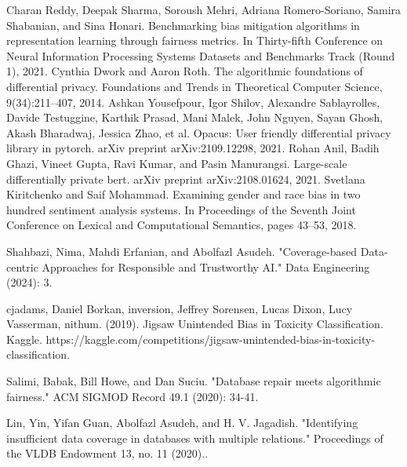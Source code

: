 \documentclass[11pt]{article} %
\begin{document}
\begin{thebibliography}{10}
\begin{small}
 Charan Reddy, Deepak Sharma, Soroush Mehri, Adriana Romero-Soriano, Samira Shabanian, and Sina Honari. Benchmarking bias mitigation algorithms in representation learning through fairness metrics. In Thirty-fifth Conference on Neural Information Processing Systems Datasets and Benchmarks Track (Round 1), 2021.
 Cynthia Dwork and Aaron Roth. The algorithmic foundations of differential privacy. Foundations and Trends in Theoretical Computer Science, 9(34):211–407, 2014.
 Ashkan Yousefpour, Igor Shilov, Alexandre Sablayrolles, Davide Testuggine, Karthik Prasad, Mani Malek, John Nguyen, Sayan Ghosh, Akash Bharadwaj, Jessica Zhao, et al. Opacus: User friendly differential privacy library in pytorch. arXiv preprint arXiv:2109.12298, 2021.
 Rohan Anil, Badih Ghazi, Vineet Gupta, Ravi Kumar, and Pasin Manurangsi. Large-scale differentially private bert. arXiv preprint arXiv:2108.01624,
2021.
 Svetlana Kiritchenko and Saif Mohammad. Examining gender and race bias in two hundred sentiment analysis systems. In Proceedings of the Seventh Joint Conference on Lexical and Computational Semantics, pages 43–53,
2018.

 Shahbazi, Nima, Mahdi Erfanian, and Abolfazl Asudeh. "Coverage-based Data-centric Approaches for Responsible and Trustworthy AI." Data Engineering (2024): 3.

 cjadams, Daniel Borkan, inversion, Jeffrey Sorensen, Lucas Dixon, Lucy Vasserman, nithum. (2019). Jigsaw Unintended Bias in Toxicity Classification. Kaggle. https://kaggle.com/competitions/jigsaw-unintended-bias-in-toxicity-classification.

 Salimi, Babak, Bill Howe, and Dan Suciu. "Database repair meets algorithmic fairness." ACM SIGMOD Record 49.1 (2020): 34-41.

 Lin, Yin, Yifan Guan, Abolfazl Asudeh, and H. V. Jagadish. "Identifying insufficient data coverage in databases with multiple relations." Proceedings of the VLDB Endowment 13, no. 11 (2020)..

\end{small}
\end{thebibliography}
\end{document}
